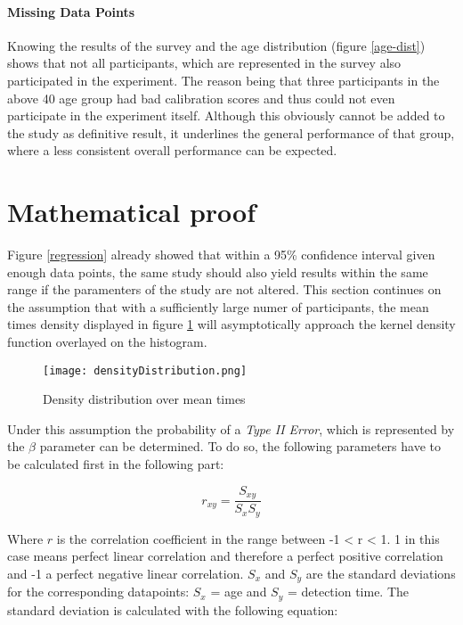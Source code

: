             \paragraph{Missing Data Points} Knowing the results of the survey and the age distribution (figure \ref*{age-dist}) shows that not all participants, which are represented in the survey also participated in the experiment. The reason being that three participants in the above 40 age group had bad calibration scores and thus could not even participate in the experiment itself. Although this obviously cannot be added to the study as definitive result, it underlines the general performance of that group, where a less consistent overall performance can be expected.

        \section{Mathematical proof}\label{mafs}

            Figure \ref*{regression} already showed that within a 95\% confidence interval given enough data points, the same study should also yield results within the same range if the paramenters of the study are not altered. This section continues on the assumption that with a sufficiently large numer of participants, the mean times density displayed in figure \ref*{means-density} will asymptotically approach the kernel density function overlayed on the histogram. 

            \begin{figure}[h]     %
                \centering
                \texttt{[image: densityDistribution.png]}
                \caption{Density distribution over mean times}\label{means-density}
            \end{figure}

            Under this assumption the probability of a \textit{Type II Error}, which is represented by the $\beta$ parameter can be determined. To do so, the following parameters have to be calculated first in the following part:

            \begin{equation}\label{r-formula}
                r_{xy} = \frac{S_{xy}}{S_{x}S_{y}}
            \end{equation}

            Where $r$ is the correlation coefficient in the range between -1 < r < 1. 1 in this case means perfect linear correlation and therefore a perfect positive correlation and -1 a perfect negative linear correlation. $S_{x}$ and $S_{y}$ are the standard deviations for the corresponding datapoints: $S_{x}$ = age and $S_{y}$ = detection time. 
            The standard deviation is calculated with the following equation:

